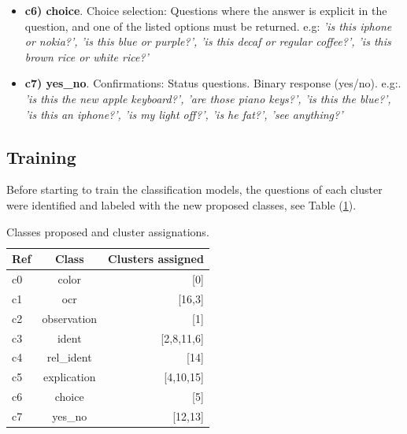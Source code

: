 \begin{itemize}
    
    \item \textbf{c6) choice}. Choice selection: Questions where the answer is explicit in the question, and one of the listed options must be returned. e.g: \emph{
    'is this iphone or nokia?',
    'is this blue or purple?',
    'is this decaf or regular coffee?',
    'is this brown rice or white rice?'}
    
    
    \item \textbf{c7) yes\_no}. Confirmations: Status questions. Binary response (yes/no).  e.g:. \emph{
    'is this the new apple keyboard?',
    'are those piano keys?',
    'is this the blue?',
    'is this an iphone?',
    'is my light off?',
    'is he fat?',
    'see anything?'}

\end{itemize}

\subsection{Training}
\label{subsec:training_models}
Before starting to train the classification models, the questions of each cluster were identified and labeled with the new proposed classes, see Table (\ref{table:clusters_assigned}).

\begin{table}[!ht]
    \centering
    \begin{tabular}{l|c|r}
        \toprule
        \textbf{Ref} &\textbf{Class} &\textbf{Clusters assigned} \\ \midrule
        c0 & color & [0] \\
        c1 & ocr & [16,3] \\
        c2 & observation & [1]\\
        c3 & ident & [2,8,11,6]\\
        c4 & rel\_ident & [14]\\
        c5 & explication & [4,10,15]\\
        c6 & choice & [5]\\
        c7 & yes\_no & [12,13] \\
        \bottomrule
    \end{tabular}
    \caption{Classes proposed and cluster assignations.}
    \label{table:clusters_assigned}
\end{table}


